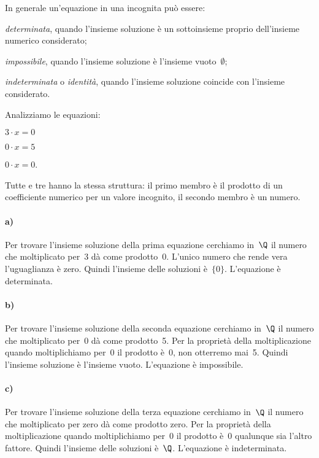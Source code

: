 In generale un'equazione in una incognita può essere:

\begin{enumeratea}
\item \emph{determinata}, quando l'insieme soluzione è un sottoinsieme 
proprio dell'insieme numerico considerato;
\item \emph{impossibile}, quando l'insieme soluzione è l'insieme 
vuoto~\(\emptyset\); 
\item \emph{indeterminata} o \emph{identità}, quando l'insieme soluzione 
coincide con l'insieme considerato.
\end{enumeratea}

\begin{esempio}{}{}
Analizziamo le equazioni:
\begin{htmulticols}{3}
\begin{enumeratea}
\item \(3\cdot x=0\)
\item \(0\cdot x=5\)
\item \(0\cdot x=0\).
\end{enumeratea}
\end{htmulticols}

Tutte e tre hanno la stessa struttura: il primo membro è il prodotto
di un coefficiente numerico per un valore incognito, il secondo membro
è un numero.

\paragraph{a)} Per trovare l'insieme soluzione della prima equazione 
cerchiamo 
in~\(\Q\) il
numero che moltiplicato per~3 dà come prodotto~0. L'unico numero che rende 
vera
l'uguaglianza è zero. Quindi l'insieme delle soluzioni è~\(\{0\}\). 
L'equazione 
è
determinata.

\paragraph{b)} Per trovare l'insieme soluzione della seconda equazione 
cerchiamo 
in~\(\Q\) il
numero che moltiplicato per~0 dà come prodotto~5. Per la proprietà
della moltiplicazione quando moltiplichiamo per~0 il prodotto è~0,
non otterremo mai~5. Quindi l'insieme soluzione è
l'insieme vuoto. L'equazione è
impossibile.

\paragraph{c)} Per trovare l'insieme soluzione della terza equazione 
cerchiamo 
in~\(\Q\) il
numero che moltiplicato per zero dà come prodotto zero. Per la
proprietà della moltiplicazione quando moltiplichiamo per~0 il
prodotto è~0 qualunque sia l'altro fattore. Quindi
l'insieme delle soluzioni è~\(\Q\). L'equazione è
indeterminata.
\end{esempio}



